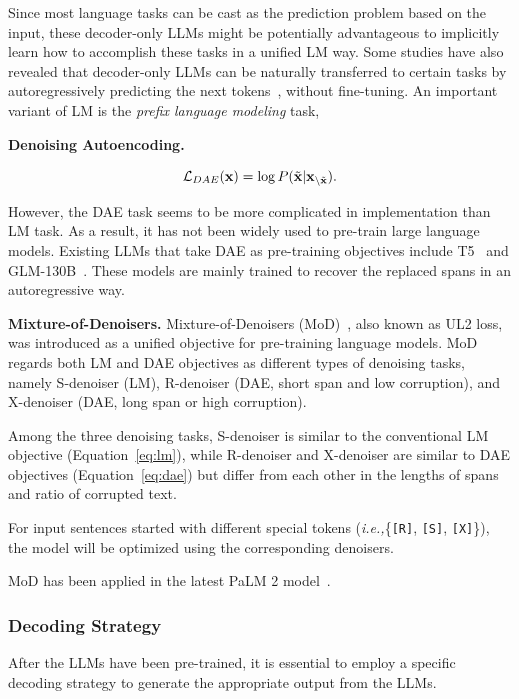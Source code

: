 Since most language tasks can be cast as the prediction problem based on the input, {these decoder-only} LLMs might be potentially advantageous to implicitly learn how to accomplish these tasks in a unified LM way. Some studies have also revealed that {decoder-only} LLMs can be naturally transferred to certain tasks by autoregressively predicting the next tokens~\cite{radford-blog-2019-language,Brown-NeurIPS-2020-Language}, without fine-tuning. An important variant of LM is the \emph{prefix language modeling} task,  

\textbf{Denoising Autoencoding.}

\begin{equation}
    \mathcal{L}_{DAE}(\mathbf{x})= \log P(\Tilde{\mathbf{x}}|\mathbf{x}_{\backslash \Tilde{\mathbf{x}}}).\label{eq:dae}
\end{equation}

However, the DAE task seems to be more complicated in implementation than LM task. As a result, it has not been widely used to pre-train  large language models. Existing LLMs that take DAE as pre-training objectives include T5~\cite{Raffel-JMLR-2020-Exploring} and GLM-130B~\cite{Zeng-arxiv-2022-GLM}. These models are mainly trained to recover the replaced spans in an autoregressive way.

\textbf{Mixture-of-Denoisers.} Mixture-of-Denoisers (MoD)~\cite{Tay-arxiv-2022-UL2}, also  known as  UL2 loss, was introduced as a unified objective for pre-training language models. MoD regards both LM and DAE objectives as different types of denoising tasks, namely {S-denoiser (LM), R-denoiser (DAE, short span and low corruption), and X-denoiser (DAE, long span or high corruption).}

Among the three denoising tasks, S-denoiser is similar to the conventional LM objective (Equation~\eqref{eq:lm}), while R-denoiser and X-denoiser are similar to DAE objectives (Equation~\eqref{eq:dae}) but differ from each other in the lengths of spans and ratio of corrupted text.  

{For input sentences started with different special tokens (\emph{i.e.,}\{\texttt{[R]}, \texttt{[S]}, \texttt{[X]}\}), the model will be optimized using the corresponding denoisers.} 

MoD has been applied in the latest PaLM 2 model~\cite{Anil-arxiv-2023-palm2}.

\subsubsection{Decoding Strategy}
\label{sec-decoding}
After the LLMs have been pre-trained, it is essential to employ a specific decoding strategy to generate the appropriate output from the LLMs. 

